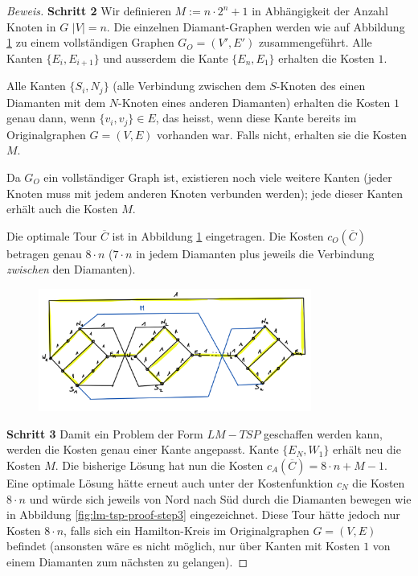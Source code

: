 \documentclass[a4paper,11pt]{scrreprt}
\begin{document}
\begin{proof}[Beweis]
\textbf{Schritt 2} Wir definieren $M := n \cdot 2^n + 1$ in Abhängigkeit der Anzahl Knoten in $G$ $|V| = n$. Die einzelnen Diamant-Graphen werden wie auf Abbildung \ref{fig:lm-tsp-proof-step2} zu einem vollständigen Graphen $G_O = (V', E')$ zusammengeführt. Alle Kanten $\{E_i, E_{i+1}\}$ und ausserdem die Kante $\{E_n, E_1\}$ erhalten die Kosten $1$. 

Alle Kanten $\{S_i, N_j\}$ (alle Verbindung zwischen dem $S$-Knoten des einen Diamanten mit dem $N$-Knoten eines anderen Diamanten) erhalten die Kosten $1$ genau dann, wenn $\{v_i, v_j\} \in E$, das heisst, wenn diese Kante bereits im Originalgraphen $G = (V, E)$ vorhanden war. Falls nicht, erhalten sie die Kosten $M$. 

Da $G_O$ ein vollständiger Graph ist, existieren noch viele weitere Kanten (jeder Knoten muss mit jedem anderen Knoten verbunden werden); jede dieser Kanten erhält auch die Kosten $M$. 

Die optimale Tour $\overline{C}$ ist in Abbildung \ref{fig:lm-tsp-proof-step2} eingetragen. Die Kosten $c_O(\overline{C})$ betragen genau $8 \cdot n$ ($7 \cdot n$ in jedem Diamanten plus jeweils die Verbindung \emph{zwischen} den Diamanten).

\begin{figure}[H]
\centering
\includegraphics[width=0.8\textwidth]{lm_tsp_hard_new1.png}
\caption{}
\label{fig:lm-tsp-proof-step2}
\end{figure}

\textbf{Schritt 3} Damit ein Problem der Form $LM-TSP$ geschaffen werden kann, werden die Kosten genau einer Kante angepasst. Kante $\{E_N, W_1\}$ erhält neu die Kosten $M$. Die bisherige Lösung hat nun die Kosten $c_A(\overline{C}) = 8 \cdot n + M - 1$. Eine optimale Lösung hätte erneut auch unter der Kostenfunktion $c_N$ die Kosten $8 \cdot n$ und würde sich jeweils von Nord nach Süd durch die Diamanten bewegen wie in Abbildung \ref{fig:lm-tsp-proof-step3} eingezeichnet. Diese Tour hätte jedoch nur Kosten $8 \cdot n$, falls sich ein Hamilton-Kreis im Originalgraphen $G = (V, E)$ befindet (ansonsten wäre es nicht möglich, nur über Kanten mit Kosten $1$ von einem Diamanten zum nächsten zu gelangen).


\end{proof}
\end{document}
